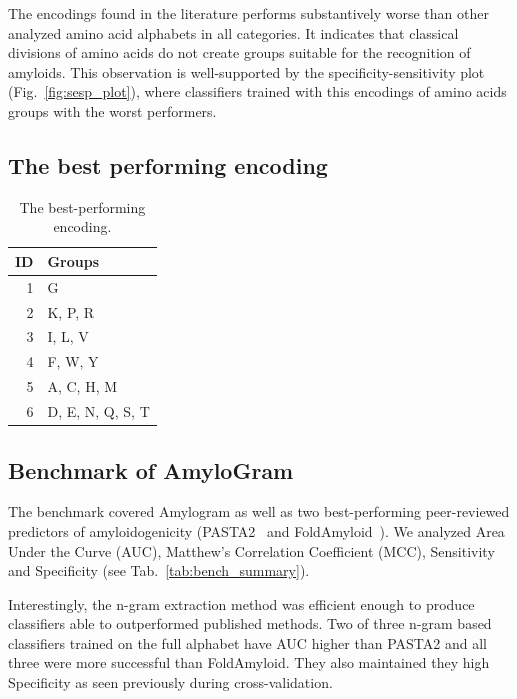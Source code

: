 \documentclass{bioinfo}
\begin{document}
  The encodings found in the literature performs substantively worse than other 
analyzed amino acid alphabets in all categories. It indicates that classical 
divisions of amino acids do not create groups suitable for the recognition of 
amyloids. This observation is well-supported by the specificity-sensitivity 
plot (Fig.~\ref{fig:sesp_plot}), where classifiers trained with this encodings 
of amino acids groups with the worst performers.

\subsection{The best performing encoding}

\begin{table}[ht]
\centering
\caption{The best-performing encoding.} 
\label{tab:best_enc}
\begin{tabular}{rl}
  \toprule
ID & Groups \\ 
  \midrule
  1 & G \\ 
   \rowcolor[gray]{0.85}  2 & K, P, R \\ 
    3 & I, L, V \\ 
   \rowcolor[gray]{0.85}  4 & F, W, Y \\ 
    5 & A, C, H, M \\ 
   \rowcolor[gray]{0.85}  6 & D, E, N, Q, S, T \\ 
   \bottomrule
\end{tabular}
\end{table}




\subsection{Benchmark of AmyloGram}

The benchmark covered Amylogram as well as two best-performing peer-reviewed 
predictors of amyloidogenicity (PASTA2~\citep{walsh_pasta_2014} and 
FoldAmyloid~\citep{garbuzynskiy_foldamyloid:_2010}). We analyzed Area Under the 
Curve (AUC), Matthew's Correlation Coefficient (MCC), Sensitivity and 
Specificity (see Tab.~\ref{tab:bench_summary}).
    
  Interestingly, the n-gram extraction method was efficient enough to produce 
classifiers able to outperformed published methods. Two of three n-gram based 
classifiers trained on the full alphabet have AUC higher than PASTA2 and all 
three were more successful than FoldAmyloid. They also maintained they high 
Specificity as seen previously during cross-validation.
    
\end{document}
